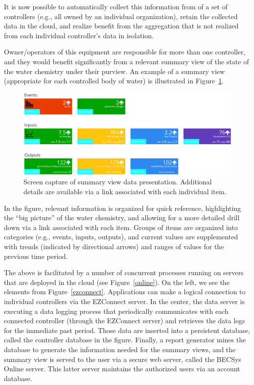 It is now possible to automatically
collect this information from of a set of controllers (e.g., all
owned by an individual organization), retain the collected data in
the cloud, and realize benefit from the aggregation that is not realized
from each individual controller's data in isolation.

Owner/operators of this equipment are responsible for 
more than one controller, and they would benefit significantly from a relevant
summary view of the state of the water chemistry under their purview.
An example of a summary view (appropriate for each controlled body of water)
is illustrated in Figure~\ref{screenshot}.

\begin{figure}[htbp]
 \center
\includegraphics[width=\columnwidth]{screenshot}
    \caption{Screen capture of summary view data presentation. Additional
details are available via a link associated with each individual item.}
    \label{screenshot}
\end{figure}

In the figure, relevant information is organized for quick reference,
highlighting the ``big picture'' of the water chemistry, and allowing for
a more detailed drill down via a link associated with each item.
Groups of items are organized into categories (e.g., events, inputs,
outputs), and current values are supplemented with trends (indicated
by directional arrows) and ranges of values for the previous time period.

The above is facilitated by a number of concurrent processes running
on servers that are deployed in the cloud (see Figure~\ref{online}).
On the left, we see the elements from Figure~\ref{ezconnect}.
Applications can make a logical connection to individual controllers
via the EZConnect server.
In the center, the data server is executing a
data logging process that periodically communicates with each connected
controller (through the EZConnect server) and retrieves the data logs
for the immediate past period.
Those data are inserted into a persistent database, called the
controller database in the figure.
Finally,
a report generator mines the database to generate the information needed
for the summary views, and the summary view is served to the
user via a secure web server, called the BECSys Online server.
This latter server maintains the authorized users via an account
database.

